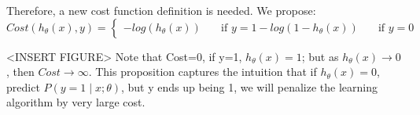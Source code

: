             Therefore, a new cost function definition is needed. We propose: 
            \[
                Cost(h_\theta(x), y) = 
                \begin{cases}
                    -log(h_\theta(x))       &\quad \text{if } y=1
                    -log(1- h_\theta(x))    &\quad \text{if } y=0
                \end{cases}
            \] 

            <INSERT FIGURE>
            Note that Cost=0, if y=1, $h_\theta(x) =1$; but as $h_\theta(x) \to 0$, then $Cost \to \infty$. This proposition captures the intuition that if $h_\theta(x)=0$, predict $P(y=1 \mid x;\theta)$, but y ends up being 1, we will penalize the learning algorithm by very large cost.
